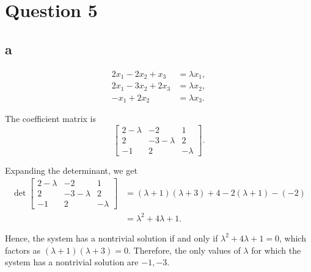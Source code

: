 \section{Question 5}
\subsection{a}

\begin{align*}
    2x_1 - 2x_2 + x_3 &= \lambda x_1, \\
    2x_1 - 3x_2 + 2x_3 &= \lambda x_2, \\
    -x_1 + 2x_2 &= \lambda x_3.
    \end{align*}
    
    The coefficient matrix is
    \[\begin{bmatrix}
    2 - \lambda & -2 & 1 \\
    2 & -3 - \lambda & 2 \\
    -1 & 2 & -\lambda
    \end{bmatrix}.\]
    
    Expanding the determinant, we get
    \begin{align*}
    \det\begin{bmatrix}
    2 - \lambda & -2 & 1 \\
    2 & -3 - \lambda & 2 \\
    -1 & 2 & -\lambda
    \end{bmatrix} &= (\lambda + 1)(\lambda + 3) + 4 - 2(\lambda + 1) - (-2) \\
    &= \lambda^2 + 4\lambda + 1.
    \end{align*}
    
    Hence, the system has a nontrivial solution if and only if $\lambda^2 + 4\lambda + 1 = 0$, which factors as $(\lambda + 1)(\lambda + 3) = 0$. Therefore, the only values of $\lambda$ for which the system has a nontrivial solution are $\boxed{-1,-3}$.
    

